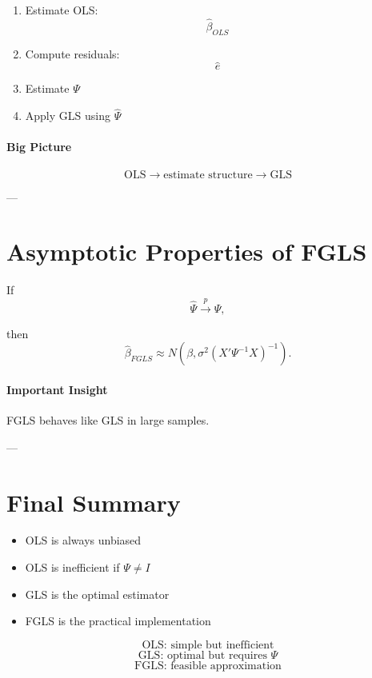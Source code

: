 \begin{enumerate}
    \item Estimate OLS:
    \[
    \hat{\beta}_{OLS}
    \]
    \item Compute residuals:
    \[
    \hat{e}
    \]
    \item Estimate $\Psi$
    \item Apply GLS using $\hat{\Psi}$
\end{enumerate}

\paragraph{Big Picture}
\[
\text{OLS} \rightarrow \text{estimate structure} \rightarrow \text{GLS}
\]

---

\section{Asymptotic Properties of FGLS}

If
\[
\hat{\Psi} \xrightarrow{p} \Psi,
\]

then
\[
\hat{\beta}_{FGLS}
\approx
N\left(
\beta,
\sigma^2 (X'\Psi^{-1}X)^{-1}
\right).
\]

\paragraph{Important Insight}
FGLS behaves like GLS in large samples.

---

\section{Final Summary}

\begin{itemize}
    \item OLS is always unbiased
    \item OLS is inefficient if $\Psi \neq I$
    \item GLS is the optimal estimator
    \item FGLS is the practical implementation
\end{itemize}

\[
\text{OLS: simple but inefficient}
\]
\[
\text{GLS: optimal but requires }\Psi
\]
\[
\text{FGLS: feasible approximation}
\]